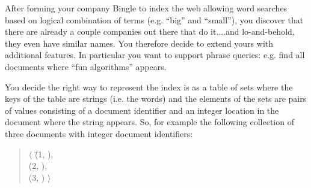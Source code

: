 \begin{cluster}
\label{grp:grm:practice-exam-ii::sets}

\begin{gram}
\label{grm:practice-exam-ii::sets}

\end{gram}
\end{cluster}

\begin{cluster}
\label{grp:grm:practice-exam-ii::forming}

\begin{gram}
\label{grm:practice-exam-ii::forming}
After forming your company Bingle to index the web allowing word
searches based on logical combination of terms (e.g. ``big'' and
``small''), you discover that there are already a couple companies out
there that do it....and lo-and-behold, they even have similar names.
You therefore decide to extend yours with additional features.  In
particular you want to support phrase queries: e.g. find all
documents where ``fun algorithms'' appears.

\end{gram}
\end{cluster}

\begin{cluster}
\label{grp:grm:practice-exam-ii::decide}

\begin{gram}
\label{grm:practice-exam-ii::decide}
You decide the right way to represent the index is as a table of sets
where the keys of the table are strings (i.e. the words) and the
elements of the sets are pairs of values consisting of a document
identifier and an integer location in the document where the string
appears.  So, for example the following collection of three documents
with integer document identifiers:

\end{gram}
\end{cluster}

\begin{cluster}
\label{grp:qut:practice-exam-ii::read}

\begin{quote}
\label{qut:practice-exam-ii::read}
\begin{tabbing}
 $\langle$
  \=(1, ), \\
  \>(2, ),\\
  \>(3, ) $\rangle$
\end{tabbing}

\end{quote}
\end{cluster}

